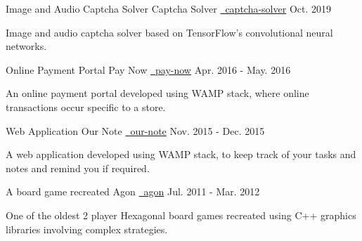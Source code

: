 \begin{cventries}
  \cventry
    {Image and Audio Captcha Solver}
    {Captcha Solver}
    {\href{https://github.com/mukeshmk/image-audio-captcha}{\faGithubSquare\ captcha-solver}}
    {Oct. 2019}
    {
      \begin{cvitems}
        \item {Image and audio captcha solver based on TensorFlow’s convolutional neural networks.}
      \end{cvitems}
    }
  \cventry
    {Online Payment Portal}
    {Pay Now}
    {\href{https://github.com/mukeshmk/pay-now}{\faGithubSquare\ pay-now}}
    {Apr. 2016 - May. 2016}
    {
      \begin{cvitems}
        \item {An online payment portal developed using WAMP stack, where online transactions occur specific to a store.}
      \end{cvitems}
    }
  \cventry
    {Web Application}
    {Our Note}
    {\href{https://github.com/mukeshmk/our-note}{\faGithubSquare\ our-note}}
    {Nov. 2015 - Dec. 2015}
    {
      \begin{cvitems}
        \item {A web application developed using WAMP stack, to keep track of your tasks and notes and remind you if required.}
      \end{cvitems}
    }  
  \cventry
    {A board game recreated}
    {Agon}
    {\href{https://github.com/mukeshmk/agon}{\faGithubSquare\ agon}}
    {Jul. 2011 - Mar. 2012}
    {
      \begin{cvitems}
        \item {One of the oldest 2 player Hexagonal board games recreated using C++ graphics libraries involving complex strategies.}
      \end{cvitems}
    }
\end{cventries}
